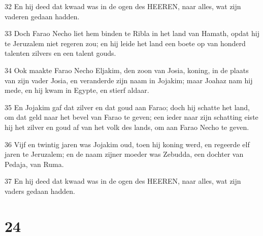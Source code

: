 \par 32 En hij deed dat kwaad was in de ogen des HEEREN, naar alles, wat zijn vaderen gedaan hadden.
\par 33 Doch Farao Necho liet hem binden te Ribla in het land van Hamath, opdat hij te Jeruzalem niet regeren zou; en hij leide het land een boete op van honderd talenten zilvers en een talent gouds.
\par 34 Ook maakte Farao Necho Eljakim, den zoon van Josia, koning, in de plaats van zijn vader Josia, en veranderde zijn naam in Jojakim; maar Joahaz nam hij mede, en hij kwam in Egypte, en stierf aldaar.
\par 35 En Jojakim gaf dat zilver en dat goud aan Farao; doch hij schatte het land, om dat geld naar het bevel van Farao te geven; een ieder naar zijn schatting eiste hij het zilver en goud af van het volk des lands, om aan Farao Necho te geven.
\par 36 Vijf en twintig jaren was Jojakim oud, toen hij koning werd, en regeerde elf jaren te Jeruzalem; en de naam zijner moeder was Zebudda, een dochter van Pedaja, van Ruma.
\par 37 En hij deed dat kwaad was in de ogen des HEEREN, naar alles, wat zijn vaders gedaan hadden.

\chapter{24}

